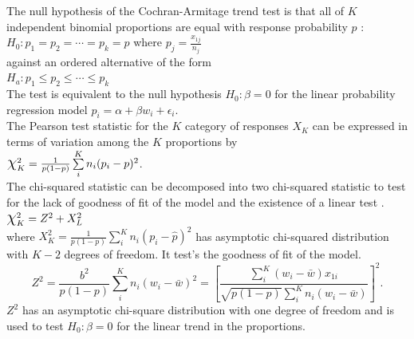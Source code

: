 \documentclass[12pt,oneside]{report}
\theoremstyle{definition}
\theoremstyle{mystyle}
\begin{document}
The  null hypothesis of the  Cochran-Armitage trend test is that all  of $K$ independent binomial proportions are equal with response probability $p$ :\\
$H_{0}:p_{1}=p_{2}=\cdots=p_{k}=p$ where $p_{j}=\frac{x_{1j}}{n_{j}}$ \\against an ordered alternative of the form\\
$H_{a}:p_{1} \leq p_{2}\leq\cdots \leq p_{k}$\\
The test is equivalent to    the null hypothesis  $H_{0}:\beta=0$ for the linear probability  regression model $p_{i}=\alpha+\beta w_{i} +\epsilon_{i}$.\\

The Pearson test statistic for the $K$ category of responses $X_{K}$  can be expressed in terms of variation among the $K$ proportions by \\

$\mbox{\Large$\chi$}^2_{K}=\frac{1}{p(1-p)}\sum\limits_{i}^{K}n_{i}(p_{i}-p)^2$.\\

The chi-squared statistic  can be decomposed into two  chi-squared statistic to test for the lack of  goodness of fit of the model and the existence of a linear test \cite{Agresti2013}.\\

$\mbox{\Large$\chi$}_{K}^{2}=Z^2+X_{L}^2$\\
where $X^2_{K}=\frac{1}{p(1-p)}\sum\limits_{i}^{K}n_{i}(p_{i}-\hat{p})^2$ has asymptotic chi-squared distribution with $K-2$ degrees of freedom. It test's the goodness of fit of the model.\\


\begin{equation}
Z^2=\frac{b^2}{p(1-p)}\sum\limits_{i}^{K}n_{i}(w_{i}-\bar{w})^2=\left[ \frac{\sum\limits_{i}^{K}(w_{i}-\bar{w})x_{1i}}{\sqrt{p(1-p)}\sum\limits_{i}^{K}n_{i}(w_{i}-\bar{w})}\right]^2.
\end{equation}
$Z^2$ has an asymptotic chi-square distribution with one degree of freedom and is used to test $H_{0}:\beta=0$ for the linear trend in the proportions.
\end{document}
